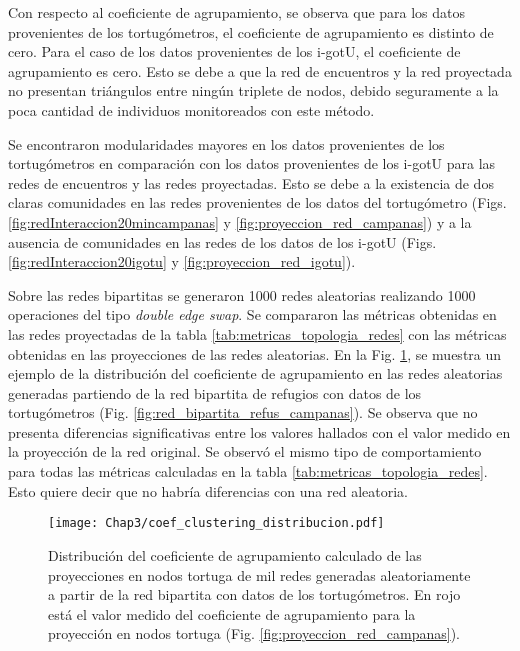 Con respecto al coeficiente de agrupamiento, se observa que para los datos provenientes de los tortugómetros, el coeficiente de agrupamiento es distinto de cero. Para el caso de los datos provenientes de los i-gotU, el coeficiente de agrupamiento es cero. Esto se debe a que la red de encuentros y la red proyectada no presentan triángulos entre ningún triplete de nodos, debido seguramente a la poca cantidad de individuos monitoreados con este método. 

Se encontraron modularidades mayores en los datos provenientes de los tortugómetros en comparación con los datos provenientes de los i-gotU para las redes de encuentros y las redes proyectadas. Esto se debe a la existencia de dos claras comunidades en las redes provenientes de los datos del tortugómetro (Figs. \ref{fig:redInteraccion20mincampanas} y \ref{fig:proyeccion_red_campanas}) y a la ausencia de comunidades en las redes de los datos de los i-gotU (Figs. \ref{fig:redInteraccion20igotu} y \ref{fig:proyeccion_red_igotu}).
 
Sobre las redes bipartitas se generaron 1000 redes aleatorias  realizando 1000 operaciones del tipo \textit{double edge swap}. Se compararon las métricas obtenidas en las redes proyectadas de la tabla \ref{tab:metricas_topologia_redes} con las métricas obtenidas en las proyecciones de las redes aleatorias. En la Fig. \ref{fig:distribucion_coef_agrupa}, se muestra un ejemplo de la distribución del coeficiente de agrupamiento en las redes aleatorias generadas partiendo de la red bipartita de refugios con datos de los tortugómetros (Fig. \ref{fig:red_bipartita_refus_campanas}). Se observa que no presenta diferencias significativas entre los valores hallados con el valor medido en la proyección de la red original. Se observó el mismo tipo de comportamiento para todas las métricas calculadas en la tabla \ref{tab:metricas_topologia_redes}. Esto quiere decir que no habría diferencias con una red aleatoria.
\begin{figure}[ht]
    \begin{center}
        \texttt{[image: Chap3/coef\_clustering\_distribucion.pdf]}
        \caption[Distribución del coeficiente de agrupamiento en proyecciones de redes aleatorias.]{Distribución del coeficiente de agrupamiento calculado de las proyecciones en nodos tortuga de mil redes generadas aleatoriamente a partir de la red bipartita con datos de los tortugómetros. En rojo está el valor medido del coeficiente de agrupamiento para la proyección en nodos tortuga (Fig. \ref{fig:proyeccion_red_campanas}).}
        \label{fig:distribucion_coef_agrupa}
       
        \end{center}
\end{figure}
 
